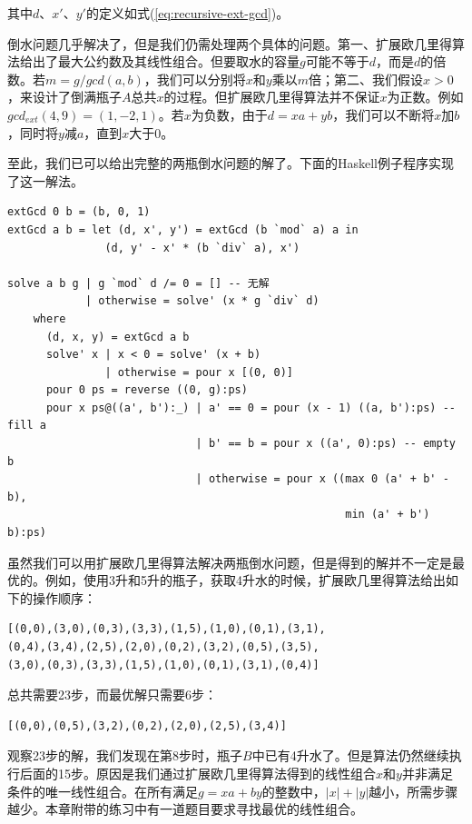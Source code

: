 \documentclass[b5paper]{ctexart}
\begin{document}
其中$d$、$x'$、$y'$的定义如式(\ref{eq:recursive-ext-gcd})。

倒水问题几乎解决了，但是我们仍需处理两个具体的问题。第一、扩展欧几里得算法给出了最大公约数及其线性组合。但要取水的容量$g$可能不等于$d$，而是$d$的倍数。若$m = g / gcd(a, b)$，我们可以分别将$x$和$y$乘以$m$倍；第二、我们假设$x>0$，来设计了倒满瓶子$A$总共$x$的过程。但扩展欧几里得算法并不保证$x$为正数。例如$gcd_{ext}(4, 9) = (1, -2, 1)$。若$x$为负数，由于$d = x a + y b$，我们可以不断将$x$加$b$，同时将$y$减$a$，直到$x$大于0。

至此，我们已可以给出完整的两瓶倒水问题的解了。下面的Haskell例子程序实现了这一解法。

\lstset{language=Haskell}
\begin{lstlisting}[style=Haskell]
extGcd 0 b = (b, 0, 1)
extGcd a b = let (d, x', y') = extGcd (b `mod` a) a in
               (d, y' - x' * (b `div` a), x')

solve a b g | g `mod` d /= 0 = [] -- 无解
            | otherwise = solve' (x * g `div` d)
    where
      (d, x, y) = extGcd a b
      solve' x | x < 0 = solve' (x + b)
               | otherwise = pour x [(0, 0)]
      pour 0 ps = reverse ((0, g):ps)
      pour x ps@((a', b'):_) | a' == 0 = pour (x - 1) ((a, b'):ps) -- fill a
                             | b' == b = pour x ((a', 0):ps) -- empty b
                             | otherwise = pour x ((max 0 (a' + b' - b),
                                                    min (a' + b') b):ps)
\end{lstlisting}

虽然我们可以用扩展欧几里得算法解决两瓶倒水问题，但是得到的解并不一定是最优的。例如，使用3升和5升的瓶子，获取4升水的时候，扩展欧几里得算法给出如下的操作顺序：

\begin{verbatim}
[(0,0),(3,0),(0,3),(3,3),(1,5),(1,0),(0,1),(3,1),
(0,4),(3,4),(2,5),(2,0),(0,2),(3,2),(0,5),(3,5),
(3,0),(0,3),(3,3),(1,5),(1,0),(0,1),(3,1),(0,4)]
\end{verbatim}

总共需要23步，而最优解只需要6步：

\begin{verbatim}
[(0,0),(0,5),(3,2),(0,2),(2,0),(2,5),(3,4)]
\end{verbatim}

观察23步的解，我们发现在第8步时，瓶子$B$中已有4升水了。但是算法仍然继续执行后面的15步。原因是我们通过扩展欧几里得算法得到的线性组合$x$和$y$并非满足条件的唯一线性组合。在所有满足$g = x a + b y$的整数中，$|x| + |y|$越小，所需步骤越少。本章附带的练习中有一道题目要求寻找最优的线性组合。
\end{document}
